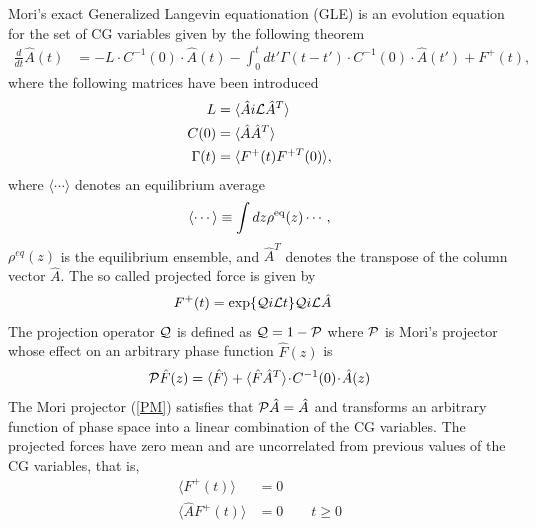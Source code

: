 \documentclass[b5paper,openright,10pt]{book}
\newcommand{\esc}{\!\cdot\!}
\begin{document}
Mori's  exact  Generalized Langevin  equationation  (GLE)  is an  evolution
equation for the set of CG variables given by the following theorem\cite{Mori1965,Zwanzig2001,Kubo1991}
\begin{align}
\frac{d}{dt}\hat{A}(t) &= -L\esc C^{-1}(0)\esc \hat{A} (t)
-\int_0^tdt'\Gamma(t-t')\esc  C^{-1}(0)\esc \hat{A} (t') +F^+(t),
\label{exact}
\end{align}
where the following matrices have been introduced
\begin{align}
L&=\langle \hat{A}i{\cal L}\hat{A}^T\rangle
\nonumber\\
C(0)&=\langle \hat{A}\hat{A}^T\rangle
\nonumber\\
\Gamma(t)&=\langle F^+(t)F^{+T}(0)\rangle,
\label{def}
\end{align}
where  $\langle\cdots \rangle$
denotes an equilibrium average
\begin{equation}
\langle\cdots\rangle\equiv \int dz\rho^{\rm eq}(z)\cdots,
\label{esc}
\end{equation}
$\rho^{eq}(z)$ is  the  equilibrium  ensemble, and $\hat{A}^T$ denotes the transpose of the column vector $\hat{A}$.
The so called projected force is given by
\begin{align}
F^+(t)&= \exp\{{\cal Q}i{\cal L}t\} {\cal Q}i{\cal L}\hat{A}  
\label{Proj}
\end{align}
The projection operator ${\cal Q}$ is defined as ${\cal Q}=1-{\cal P}$
where  ${\cal P}$  is Mori's  projector whose  effect on  an arbitrary
phase function $\hat{F}(z)$ is
\begin{align}
  {\cal P}\hat{F}(z) = \langle \hat{F}\rangle+ \langle \hat{F}\hat{A}^T \rangle\esc  C^{-1}(0)\esc  \hat{A}(z)
\label{PM}
\end{align}
The  Mori  projector  (\ref{PM})   satisfies  that  ${\cal  P}\hat{A}=
\hat{A}$ and  transforms an arbitrary  function of phase space  into a
linear combination  of the  CG variables.   The projected  forces have
zero  mean  and  are  uncorrelated  from
previous values of the CG variables, that is, 
\begin{align}
\langle  F^+  (t)\rangle&=0  
\nonumber\\
\langle \hat{A} F^+ (t)\rangle&=0 \quad\quad t\ge 0
\end{align}
\end{document}
